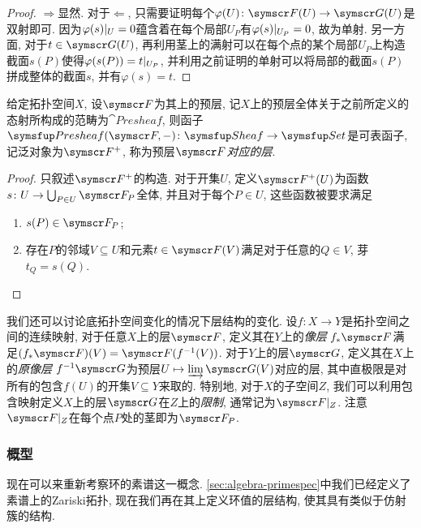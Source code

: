 \begin{proof}
  $\Rightarrow$显然. 对于$\Leftarrow$, 只需要证明每个$\varphi (U)\colon \sheaf{F}(U)\to\sheaf{G}(U)$是双射即可. 因为$\varphi(s)\vert_{U}=0$蕴含着在每个局部$U_P$有$\varphi(s)\vert_{U_P}=0$, 故为单射. 另一方面, 对于$t\in \sheaf{G}(U)$, 再利用茎上的满射可以在每个点的某个局部$U_P$上构造截面$s(P)$使得$\varphi(s(P))=t\vert_{U_P}$, 并利用之前证明的单射可以将局部的截面$s(P)$拼成整体的截面$s$, 并有$\varphi(s)=t$.
\end{proof}

\begin{proposition}
  给定拓扑空间$X$, 设$\sheaf{F}$为其上的预层, 记$X$上的预层全体关于之前所定义的态射所构成的范畴为$\cat{Presheaf}$, 则函子$\cat{Presheaf}(\sheaf{F}, -)\colon \cat{Sheaf}\to \cat{Set}$是可表函子, 记泛对象为$\sheaf{F}^+$, 称为预层$\sheaf{F}$\emph{对应的层}.
\end{proposition}

\begin{proof}
  只叙述$\sheaf{F}^+$的构造. 对于开集$U$, 定义$\sheaf{F}^+(U)$为函数$s\colon U\to \bigcup_{P\in U}\sheaf{F}_P$全体, 并且对于每个$P\in U$, 这些函数被要求满足
  \begin{enumerate}
    \item $s(P)\in\sheaf{F}_P$;
    \item 存在$P$的邻域$V\subseteq U$和元素$t\in \sheaf{F}(V)$满足对于任意的$Q\in V$, 芽$t_Q=s(Q)$.
  \end{enumerate}
\end{proof}

我们还可以讨论底拓扑空间变化的情况下层结构的变化. 设$f\colon X\to Y$是拓扑空间之间的连续映射, 对于任意$X$上的层$\sheaf{F}$, 定义其在$Y$上的\emph{像层} $f_*\sheaf{F}$满足$(f_*\sheaf{F})(V)=\sheaf{F}(f^{-1}(V))$. 对于$Y$上的层$\sheaf{G}$, 定义其在$X$上的\emph{原像层} $f^{-1}\sheaf{G}$为预层$U\mapsto\dlim \sheaf{G}(V)$对应的层, 其中直极限是对所有的包含$f(U)$的开集$V\subseteq Y$来取的. 特别地, 对于$X$的子空间$Z$, 我们可以利用包含映射定义$X$上的层$\sheaf{G}$在$Z$上的\emph{限制}, 通常记为$\sheaf{F}\restrict{Z}$. 注意$\sheaf{F}\restrict{Z}$在每个点$P$处的茎即为$\sheaf{F}_P$.

\subsubsection{概型}

现在可以来重新考察环的素谱这一概念. \ref{sec:algebra-primespec}中我们已经定义了素谱上的Zariski拓扑, 现在我们再在其上定义环值的层结构, 使其具有类似于仿射簇的结构.

